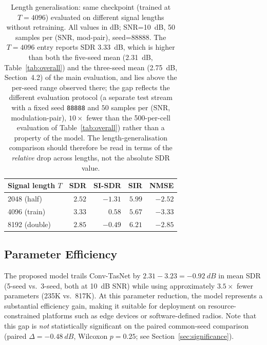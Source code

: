 \documentclass[twocolumn,english]{svjour3}
\begin{document}
\begin{table}[t]
    \centering
    \small
    \caption{Length generalisation: same checkpoint (trained at $T=4096$) evaluated on different signal lengths without retraining. All values in dB; SNR=\SI{10}{dB}, 50 samples per (SNR, mod-pair), seed=88888. The $T{=}4096$ entry reports SDR \num{3.33}~dB, which is higher than both the five-seed mean (\num{2.31}~dB, Table~\ref{tab:overall}) and the three-seed mean (\num{2.75}~dB, Section~4.2) of the main evaluation, and lies above the per-seed range observed there; the gap reflects the different evaluation protocol (a separate test stream with a fixed seed \texttt{88888} and $50$ samples per (SNR, modulation-pair), $10\times$ fewer than the 500-per-cell evaluation of Table~\ref{tab:overall}) rather than a property of the model. The length-generalisation comparison should therefore be read in terms of the \emph{relative} drop across lengths, not the absolute SDR value.}
    \label{tab:length}
    \begin{tabular}{lrrrr}
        \toprule
        Signal length $T$ & SDR & SI-SDR & SIR & NMSE \\
        \midrule
        2048 (half)   & $2.52$ & $-1.31$ & $5.99$ & $-2.52$ \\
        4096 (train)  & $\mathbf{3.33}$ & $\mathbf{0.58}$ & $5.67$ & $\mathbf{-3.33}$ \\
        8192 (double) & $2.85$ & $-0.49$ & $\mathbf{6.21}$ & $-2.85$ \\
        \bottomrule
    \end{tabular}
\end{table}

\subsection{Parameter Efficiency}

The proposed model trails Conv-TasNet by $\num{2.31} - \num{3.23} = -\SI{0.92}{dB}$ in mean SDR (5-seed vs.\ 3-seed, both at \SI{10}{dB} SNR) while using approximately $3.5\times$ fewer parameters (235K vs.~817K). At this parameter reduction, the model represents a substantial efficiency gain, making it suitable for deployment on resource-constrained platforms such as edge devices or software-defined radios. Note that this gap is \emph{not} statistically significant on the paired common-seed comparison (paired $\Delta = -\SI{0.48}{dB}$, Wilcoxon $p=0.25$; see Section~\ref{sec:significance}).
\end{document}
